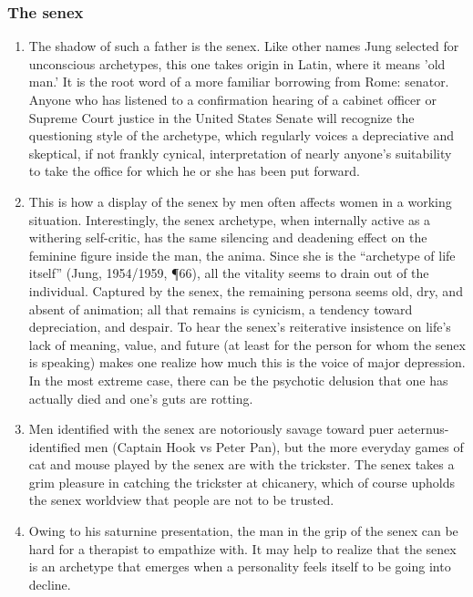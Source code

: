 \subsubsection{The senex}

\begin{enumerate}

\item {} The shadow of such a father is the senex. Like other
names Jung selected for unconscious archetypes, this one takes origin in Latin,
where it means 'old man.' It is the root word of a more familiar borrowing from
Rome: senator. Anyone who has listened to a confirmation hearing of a cabinet
officer or Supreme Court justice in the United States Senate will recognize the
questioning style of the archetype, which regularly voices a depreciative and
skeptical, if not frankly cynical, interpretation of nearly anyone's
suitability to take the office for which he or she has been put forward.

\item {} This is how a display of the
senex by men often affects women in a working situation. Interestingly, the
senex archetype, when internally active as a withering self-critic, has the
same silencing and deadening effect on the feminine figure inside the man, the
anima. Since she is the ``archetype of life itself'' (Jung, 1954/1959, ¶66), all
the vitality seems to drain out of the individual. Captured by the senex, the
remaining persona seems old, dry, and absent of animation; all that remains is
cynicism, a tendency toward depreciation, and despair. To hear the senex's
reiterative insistence on life's lack of meaning, value, and future (at least
for the person for whom the senex is speaking) makes one realize how much this
is the voice of major depression. In the most extreme case, there can be the
psychotic delusion that one has actually died and one's guts are rotting.

\item {}
Men identified with the senex are notoriously savage toward puer
aeternus-identified men (Captain Hook vs Peter Pan), but the more everyday
games of cat and mouse played by the senex are with the trickster. The senex
takes a grim pleasure in catching the trickster at chicanery, which of course
upholds the senex worldview that people are not to be trusted.

\item {} Owing to his saturnine presentation, the man
in the grip of the senex can be hard for a therapist to empathize with. It may
help to realize that the senex is an archetype that emerges when a personality
feels itself to be going into decline.


\end{enumerate}
